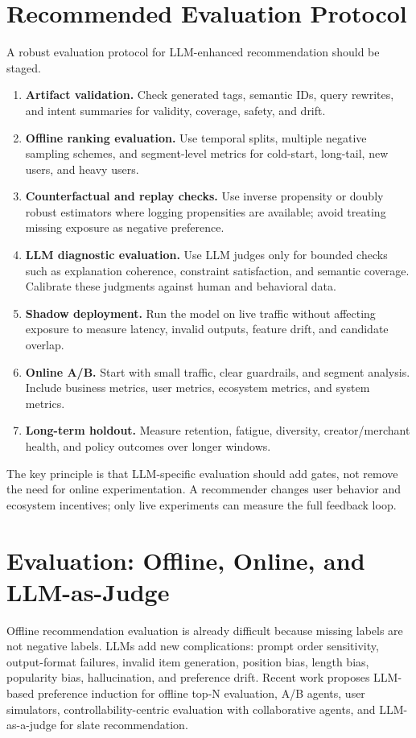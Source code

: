 \documentclass[11pt]{article}
\begin{document}
\section{Recommended Evaluation Protocol}

A robust evaluation protocol for LLM-enhanced recommendation should be staged.

\begin{enumerate}
  \item \textbf{Artifact validation.} Check generated tags, semantic IDs, query rewrites, and intent summaries for validity, coverage, safety, and drift.
  \item \textbf{Offline ranking evaluation.} Use temporal splits, multiple negative sampling schemes, and segment-level metrics for cold-start, long-tail, new users, and heavy users.
  \item \textbf{Counterfactual and replay checks.} Use inverse propensity or doubly robust estimators where logging propensities are available; avoid treating missing exposure as negative preference.
  \item \textbf{LLM diagnostic evaluation.} Use LLM judges only for bounded checks such as explanation coherence, constraint satisfaction, and semantic coverage. Calibrate these judgments against human and behavioral data.
  \item \textbf{Shadow deployment.} Run the model on live traffic without affecting exposure to measure latency, invalid outputs, feature drift, and candidate overlap.
  \item \textbf{Online A/B.} Start with small traffic, clear guardrails, and segment analysis. Include business metrics, user metrics, ecosystem metrics, and system metrics.
  \item \textbf{Long-term holdout.} Measure retention, fatigue, diversity, creator/merchant health, and policy outcomes over longer windows.
\end{enumerate}

The key principle is that LLM-specific evaluation should add gates, not remove the need for online experimentation. A recommender changes user behavior and ecosystem incentives; only live experiments can measure the full feedback loop.

\section{Evaluation: Offline, Online, and LLM-as-Judge}

Offline recommendation evaluation is already difficult because missing labels are not negative labels. LLMs add new complications: prompt order sensitivity, output-format failures, invalid item generation, position bias, length bias, popularity bias, hallucination, and preference drift. Recent work proposes LLM-based preference induction for offline top-N evaluation, A/B agents, user simulators, controllability-centric evaluation with collaborative agents, and LLM-as-a-judge for slate recommendation.
\end{document}

